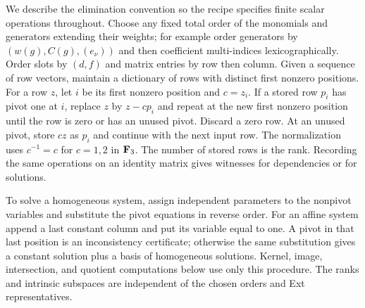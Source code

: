 We describe the elimination convention so the recipe specifies finite
scalar operations throughout.  Choose any fixed total order of the
monomials and generators extending their weights; for example order
generators by $(w(g),C(g),(e_\nu))$ and then coefficient multi-indices
lexicographically.  Order slots by $(d,f)$ and matrix entries by row
then column.  Given a sequence of row vectors, maintain a dictionary
of rows with distinct first nonzero positions.  For a row $z$, let $i$
be its first nonzero position and $c=z_i$.  If a stored row $p_i$ has
pivot one at $i$, replace $z$ by $z-cp_i$ and repeat at the new first
nonzero position until the row is zero or has an unused pivot.
Discard a zero row.  At an unused pivot, store $c z$ as
$p_i$ and continue with the next input row.  The normalization uses
$c^{-1}=c$ for $c=1,2$ in $\mathbf F_3$.  The number of stored rows is the
rank.  Recording the same operations on an identity matrix gives
witnesses for dependencies or for solutions.

To solve a homogeneous system, assign independent parameters to the
nonpivot variables and substitute the pivot equations in reverse
order.  For an affine system append a last constant column and put its
variable equal to one.  A pivot in that last position is an
inconsistency certificate; otherwise the same substitution gives a
constant solution plus a basis of homogeneous solutions.  Kernel,
image, intersection, and quotient computations below use only this
procedure.  The ranks and intrinsic subspaces are independent of the
chosen orders and Ext representatives.


